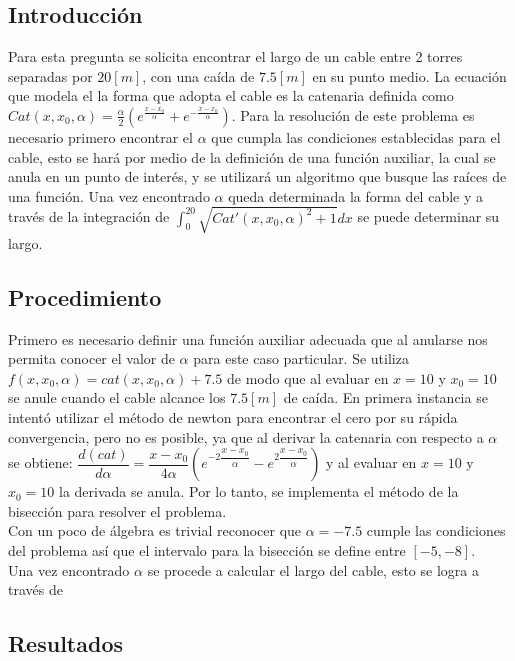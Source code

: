 \documentclass[a4paper, 11pt, spanish]{article}
\begin{document}
\subsection{Introducci\'on}
\noindent Para esta pregunta se solicita encontrar el largo de un cable entre 2 torres separadas por $20[m]$, con una caída de $7.5[m]$ en su punto medio. La ecuación que modela el la forma que adopta el cable es la catenaria definida como $Cat(x,x_0,\alpha) = \frac{\alpha}{2}(e^{\frac{x-x_0}{\alpha}} + e^{-\frac{x-x_0}{\alpha}})$. Para la resolución de este problema es necesario primero encontrar el $\alpha$ que cumpla las condiciones establecidas para el cable, esto se hará por medio de la definición de una función auxiliar, la cual se anula en un punto de interés, y se utilizará un algoritmo que busque las raíces de una función. Una vez encontrado $\alpha$ queda determinada la forma del cable y a través de la integración de $\int_0^{20} \sqrt{Cat'(x,x_0,\alpha)^2 + 1} dx $ se puede determinar su largo.

\subsection{Procedimiento}
Primero es necesario definir una función auxiliar adecuada que al anularse nos permita conocer el valor de $\alpha$ para este caso particular. Se utiliza $f(x,x_0,\alpha) = cat(x,x_0,\alpha) + 7.5$ de modo que al evaluar en $x = 10$ y $x_0 = 10$ se anule cuando el cable alcance los $7.5 [m]$ de caída. En primera instancia se intentó utilizar el método de newton para encontrar el cero por su rápida convergencia, pero no es posible, ya que al derivar la catenaria con respecto a $\alpha$ se obtiene: $\dfrac{d (cat)}{d \alpha} = \dfrac{ x-x_0}{ 4 \alpha }(e^{ -2 \dfrac{x-x_0}{\alpha}   } - e^{ 2 \dfrac{x-x_0}{\alpha}   })$ y al evaluar en $x = 10$ y $x_0 = 10$ la derivada se anula. Por lo tanto, se implementa el método de la bisección para resolver el problema.\\
\noindent Con un poco de álgebra es trivial reconocer que $\alpha = -7.5$ cumple las condiciones del problema así que el intervalo para la bisección se define entre $[-5,-8]$.\\
\noindent Una vez encontrado $\alpha$ se procede a calcular el largo del cable, esto se logra a través de

\subsection{Resultados}
\end{document}

